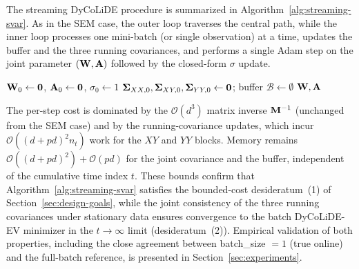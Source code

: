 \documentclass[journal,twoside]{IEEEtran}
\begin{document}
The streaming DyCoLiDE procedure is summarized in
Algorithm~\ref{alg:streaming-svar}. As in the SEM case, the outer loop
traverses the central path, while the inner loop
processes one mini-batch (or single observation) at a time, updates
the buffer and the three running covariances, and performs a single
Adam step on the joint parameter $({\mathbf W}, {\mathbf A})$ followed by the
closed-form $\sigma$ update.

\begin{algorithm}[t]
\caption{Streaming DyCoLiDE (SVAR)}
\label{alg:streaming-svar}
\DontPrintSemicolon
{}
\KwOut{$\widehat{\bbW}$, $\widehat{\bbA}$}
${\mathbf W}_0 \gets {\ensuremath{\mathbf 0}}$,
${\mathbf A}_0 \gets {\ensuremath{\mathbf 0}}$,
$\sigma_0 \gets 1$\;
$\boldsymbol{\Sigma}_{XX, 0}, \boldsymbol{\Sigma}_{XY, 0},
\boldsymbol{\Sigma}_{YY, 0} \gets {\ensuremath{\mathbf 0}}$;
buffer $\mathcal{B} \gets \emptyset$\;
\Return ${\mathbf W}, {\mathbf A}$
\end{algorithm}

The per-step cost is dominated by the $\mathcal{O}(d^3)$ matrix inverse
${\mathbf M}^{-1}$ (unchanged from the SEM case) and by the running-covariance
updates, which incur $\mathcal{O}((d + pd)^2 n_t)$ work for the
$XY$ and $YY$ blocks. Memory remains $\mathcal{O}((d+pd)^2)
+ \mathcal{O}(pd)$ for the joint covariance and the buffer, independent
of the cumulative time index $t$. These bounds confirm that
Algorithm~\ref{alg:streaming-svar} satisfies the bounded-cost
desideratum~(1) of Section~\ref{sec:design-goals}, while the joint
consistency of the three running covariances under stationary data
ensures convergence to the batch DyCoLiDE-EV minimizer in the
$t \to \infty$ limit (desideratum~(2)). Empirical validation of both
properties, including the close agreement between
batch\_size $= 1$ (true online) and the full-batch reference, is
presented in Section~\ref{sec:experiments}.
\end{document}
